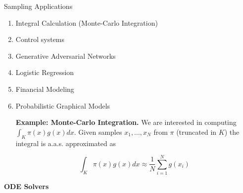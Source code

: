 \documentclass[10pt]{beamer}
\begin{document}
\begin{frame}[allowframebreaks]{Sampling Applications}

\begin{enumerate}
    \item Integral Calculation (Monte-Carlo Integration)
    \item Control systems
    \item Generative Adversarial Networks
    \item Logistic Regression
    \item Financial Modeling
    \item Probabilistic Graphical Models
    
    \medskip
    
    \textbf{Example: Monte-Carlo Integration.} We are interested in computing $\int_K \pi(x) g(x) dx $. Given samples $x_1, \dots, x_N$ from $\pi$ (truncated in $K$) the integral is a.a.s. approximated as
    
    \begin{equation*}
        \int_K \pi(x) g(x) d x \approx \frac 1 N \sum_{i = 1}^N g(x_i)
    \end{equation*}
    
    
    
\end{enumerate}

\end{frame}


\begin{frame}{}
    \vfill
    \centering
    \Large
    \textbf{ODE Solvers} 
    \vfill
\end{frame}
\end{document}
